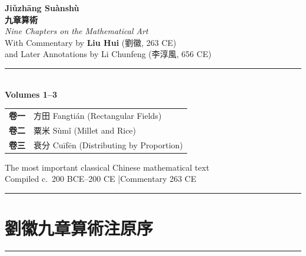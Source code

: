 \documentclass[11pt,a4paper]{article}
\begin{document}
\begin{titlepage}
\begin{center}
\vspace*{3cm}

{\Huge\bfseries\color{titlecolor} Jiǔzhāng Suànshù}\\[0.8cm]
{\LARGE\bfseries\color{sectioncolor} 九章算術}\\[1.5cm]
{\Large\textit{Nine Chapters on the Mathematical Art}}\\[2cm]
{\large With Commentary by \textbf{Liu Hui} (劉徽, 263 CE)}\\[0.5cm]
{\large and Later Annotations by Li Chunfeng (李淳風, 656 CE)}\\[3cm]

\rule{0.6\textwidth}{0.8pt}\\[1.5cm]

{\Large\bfseries Volumes 1--3}\\[0.8cm]

\begin{tabular}{cl}
\textbf{卷一} & 方田 \quad Fangtián \quad (Rectangular Fields)\\
\textbf{卷二} & 粟米 \quad Sùmǐ \quad (Millet and Rice)\\
\textbf{卷三} & 衰分 \quad Cuīfēn \quad (Distributing by Proportion)\\
\end{tabular}

\vfill

{\small The most important classical Chinese mathematical text}\\[0.3cm]
{\small Compiled c.~200 BCE--200 CE \quad|\quad Commentary 263 CE}\\[1cm]

\rule{0.4\textwidth}{0.4pt}

\end{center}
\end{titlepage}

\tableofcontents
\newpage

\section*{劉徽九章算術注原序}

\begin{center}
\rule{0.5\textwidth}{0.4pt}
\end{center}
\end{document}
